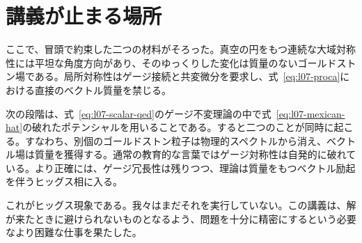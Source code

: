 \section{講義が止まる場所}

ここで、冒頭で約束した二つの材料がそろった。真空の円をもつ連続な大域対称性には平坦な角度方向があり、そのゆっくりした変化は質量のないゴールドストン場である。局所対称性はゲージ接続と共変微分を要求し、式~\eqref{eq:l07-proca}における直接のベクトル質量を禁じる。

次の段階は、式~\eqref{eq:l07-scalar-qed}のゲージ不変理論の中で式~\eqref{eq:l07-mexican-hat}の破れたポテンシャルを用いることである。すると二つのことが同時に起こる。すなわち、別個のゴールドストン粒子は物理的スペクトルから消え、ベクトル場は質量を獲得する。通常の教育的な言葉ではゲージ対称性は自発的に破れている。より正確には、ゲージ冗長性は残りつつ、理論は質量をもつベクトル励起を伴うヒッグス相に入る。

これがヒッグス現象である。我々はまだそれを実行していない。この講義は、解が来たときに避けられないものとなるよう、問題を十分に精密にするという必要なより困難な仕事を果たした。

